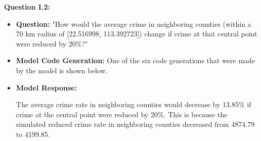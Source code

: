 \noindent\textbf{Question I.2:}
\begin{itemize}
  \item \textbf{Question:} "How would the average crime in neighboring counties (within a 70 km radius of [22.516998, 113.392723]) change if crime at that central point were reduced by 20\%?"
  
  \item \textbf{Model Code Generation:} One of the six code generations that were made by the model is shown below. 
  

  \item \textbf{Model Response:} 
  \begin{tcolorbox}[colback=white!95!black, colframe=black, title=Q2 Response, fontupper=\scriptsize, boxsep=2pt, left=3pt, right=3pt]
    The average crime rate in neighboring counties would decrease by 13.85\% if crime at the central point were reduced by 20\%. This is because the simulated reduced crime rate in neighboring counties decreased from 4874.79 to 4199.85.
    \end{tcolorbox}

\end{itemize}

